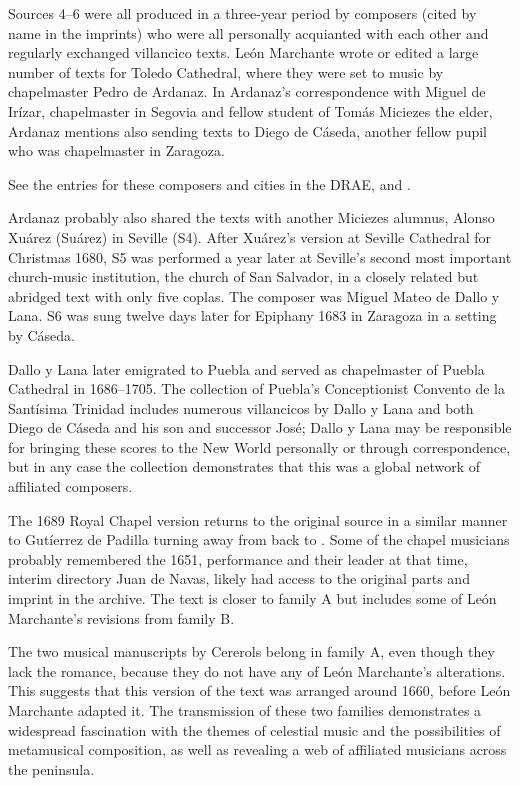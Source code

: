 Sources 4--6 were all produced in a three-year period by composers (cited by
name in the imprints) who were all personally acquianted with each other and
regularly exchanged villancico texts.
León Marchante wrote or edited a large number of texts for Toledo Cathedral,
where they were set to music by chapelmaster Pedro de Ardanaz.
In Ardanaz's correspondence with Miguel de Irízar, chapelmaster in Segovia and
fellow student of Tomás Miciezes the elder, Ardanaz mentions also sending texts
to Diego de Cáseda, another fellow pupil who was chapelmaster in Zaragoza.%
\begin{Footnote}
    See the entries for these composers and cities in the DRAE, and
    \autocite[ch. 5]{Cashner:PhD}.
\end{Footnote}
Ardanaz probably also shared the texts with another Miciezes alumnus, Alonso
Xuárez (Suárez) in Seville (S4).
After Xuárez's version at Seville Cathedral for Christmas 1680, S5 was performed
a year later at Seville's second most important church-music institution, the
church of San Salvador, in a closely related but abridged text with only five
coplas.
The composer was Miguel Mateo de Dallo y Lana.
S6 was sung twelve days later for Epiphany 1683 in Zaragoza in a setting by
Cáseda.

Dallo y Lana later emigrated to Puebla and served as chapelmaster of Puebla
Cathedral in 1686--1705.
The collection of Puebla's Conceptionist Convento de la Santísima Trinidad
includes numerous villancicos by Dallo y Lana and both Diego de Cáseda and his
son and successor José; Dallo y Lana may be responsible for bringing these
scores to the New World personally or through correspondence, but in any case
the collection demonstrates that this was a global network of affiliated
composers.%
    \Autocite{Tello:SanchezGarzaCatalogo}

The 1689 Royal Chapel version returns to the original source in a similar manner
to Gutíerrez de Padilla turning away from  back to
.
Some of the chapel musicians probably remembered the 1651, performance and their
leader at that time, interim directory Juan de Navas, likely had access to the
original parts and imprint in the archive.%
    \Autocite[]{DRAE} %
The text is closer to family A but includes some of León Marchante's
revisions from family B.

The two musical manuscripts by Cererols belong in family A, even though they
lack the romance, because they do not have any of León Marchante's
alterations.
This suggests that this version of the text was arranged around 1660, before
León Marchante adapted it.
The transmission of these two families demonstrates a widespread fascination
with the themes of celestial music and the possibilities of metamusical
composition, as well as revealing a web of affiliated musicians across the
peninsula.

